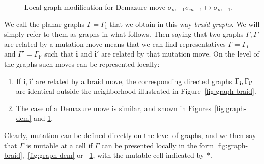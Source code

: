 \documentclass[11pt, reqno]{amsart}
\theoremstyle{definition}
\numberwithin{equation}{section}
\def\pt{\mathrm{pt}}
\newcommand{\mbi}{\mathbf{i}}
\begin{document}
\begin{figure}
\caption{Local graph modification for Demazure move $\sigma_{m-1}\sigma_{m-1}\mapsto \sigma_{m-1}$. }
\label{fig:graph-dem2}
\end{figure}

We call the planar graphs $\Gamma =\Gamma_{\mbi}$ that we obtain in this way \emph{braid graphs}. We will simply refer to them as graphs in what follows. Then saying that two graphs $\Gamma,\Gamma'$ are related by a mutation move means that we can find representatives $\Gamma = \Gamma_{\mbi}$ and $\Gamma'= \Gamma_{\mbi'}$ such that $\mbi$ and $\mbi'$ are related by that mutation move. On the level of the graphs such moves can be represented locally: 
\begin{enumerate}
\item If $\mathbf{i},\mathbf{i}'$ are related by a braid move, the corresponding directed graphs $\Gamma_{\bf i},\Gamma_{\bf i'}$ are identical outside the neighborhood illustrated in Figure~\ref{fig:graph-braid}.
\item The case of a Demazure move is similar, and shown in Figures~\ref{fig:graph-dem} and \ref{fig:graph-dem2}.
\end{enumerate}
Clearly, mutation can be defined directly on the level of graphs, and we then say that $\Gamma$ is mutable at a cell if $\Gamma$ can be presented locally in the form \ref{fig:graph-braid},~\ref{fig:graph-dem} or ~\ref{fig:graph-dem2}, with the mutable cell indicated by $*$. 
\end{document}
